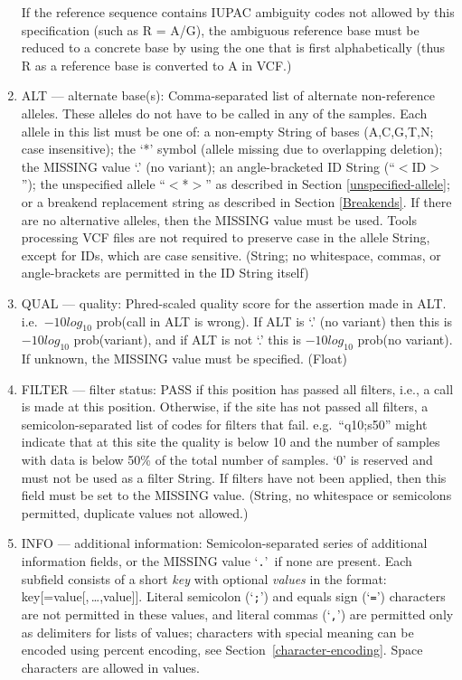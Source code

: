 \documentclass[8pt]{article}
\begin{document}
\begin{enumerate}
  If the reference sequence contains IUPAC ambiguity codes not allowed by this specification (such as R = A/G), the ambiguous reference base must be reduced to a concrete base by using the one that is first alphabetically (thus R as a reference base is converted to A in VCF.)

  \item ALT --- alternate base(s): Comma-separated list of alternate non-reference alleles.
  \label{fixed-fields-alt}
  These alleles do not have to be called in any of the samples.
  Each allele in this list must be one of: a non-empty String of bases (A,C,G,T,N; case insensitive); the `*' symbol (allele missing due to overlapping deletion); the MISSING value `.' (no variant); an angle-bracketed ID String (``$<$ID$>$''); the unspecified allele ``$<$*$>$'' as described in Section \ref{unspecified-allele}; or a breakend replacement string as described in Section \ref{Breakends}.
  If there are no alternative alleles, then the MISSING value must be used.
  Tools processing VCF files are not required to preserve case in the allele String, except for IDs, which are case sensitive.
  (String; no whitespace, commas, or angle-brackets are permitted in the ID String itself)
  \item QUAL --- quality: Phred-scaled quality score for the assertion made in ALT. i.e.\ $-10log_{10}$ prob(call in ALT is wrong).
  If ALT is `.' (no variant) then this is $-10log_{10}$ prob(variant), and if ALT is not `.' this is $-10log_{10}$ prob(no variant).
  If unknown, the MISSING value must be specified. (Float)
  \item FILTER --- filter status: PASS if this position has passed all filters, i.e., a call is made at this position.
  Otherwise, if the site has not passed all filters, a semicolon-separated list of codes for filters that fail. e.g.\ ``q10;s50'' might indicate that at this site the quality is below 10 and the number of samples with data is below 50\% of the total number of samples.
  `0' is reserved and must not be used as a filter String.
  If filters have not been applied, then this field must be set to the MISSING value.
  (String, no whitespace or semicolons permitted, duplicate values not allowed.)
  \item INFO --- additional information: Semicolon-separated series of additional information fields, or the MISSING value `{\tt .}'\ if none are present.
  Each subfield consists of a short \emph{key} with optional \emph{values} in the format: key[=value[,\,\ldots,value]].
  Literal semicolon (`{\tt ;}') and equals sign (`{\tt =}') characters are not permitted in these values, and literal commas (`{\tt ,}') are permitted only as delimiters for lists of values; characters with special meaning can be encoded using percent encoding, see Section~\ref{character-encoding}.
  Space characters are allowed in values.


\end{enumerate}
\end{document}
